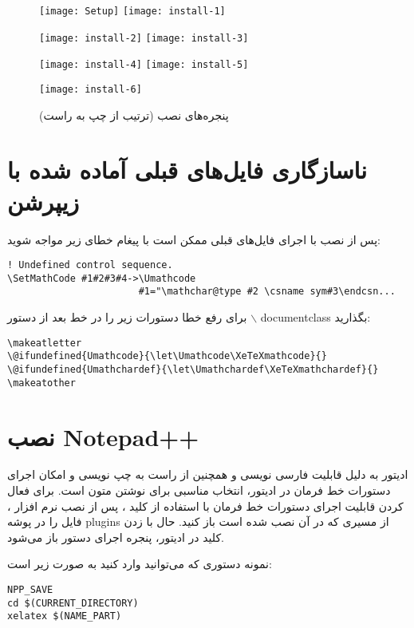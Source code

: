\latin
\begin{figure}
\texttt{[image: Setup]}\hfill
\texttt{[image: install-1]}
\vspace*{4mm}

\texttt{[image: install-2]}\hfill
\texttt{[image: install-3]}
\vspace*{4mm}

\texttt{[image: install-4]}\hfill
\texttt{[image: install-5]}
\vspace*{4mm}

\texttt{[image: install-6]}
\persian
\caption{پنجره‌های نصب  (ترتیب از چپ به راست)}
\end{figure}
\persian
\section{ناسازگاری فایل‌های قبلی آماده شده با زیپرشن }
پس از نصب  با اجرای فایل‌های قبلی ممکن است با پیغام خطای زیر مواجه شوید:
\latin
\begin{verbatim}
! Undefined control sequence.
\SetMathCode #1#2#3#4->\Umathcode 
                       #1="\mathchar@type #2 \csname sym#3\endcsn...
\end{verbatim}
\persian
برای رفع خطا دستورات زیر را در خط بعد از دستور $\backslash$ documentclass بگذارید:
\latin
\begin{verbatim}
\makeatletter
\@ifundefined{Umathcode}{\let\Umathcode\XeTeXmathcode}{}
\@ifundefined{Umathchardef}{\let\Umathchardef\XeTeXmathchardef}{}
\makeatother 
\end{verbatim}
\persian
\section{نصب Notepad++}
\baselineskip=1cm
ادیتور   به دلیل قابلیت فارسی نویسی و همچنین از راست به چپ نویسی و امکان اجرای دستورات خط فرمان در ادیتور،
انتخاب مناسبی برای نوشتن متون  است. برای فعال کردن قابلیت اجرای دستورات خط فرمان با استفاده از کلید ، پس از نصب نرم افزار
، فایل 
را در پوشه plugins  از مسیری که   در آن نصب شده است باز کنید. حال با زدن کلید   در ادیتور، پنجره اجرای دستور باز می‌شود.

نمونه دستوری که می‌توانید وارد کنید به صورت زیر است:

\begin{latin}
\begin{verbatim}
NPP_SAVE
cd $(CURRENT_DIRECTORY)
xelatex $(NAME_PART)
\end{verbatim}
\end{latin}

